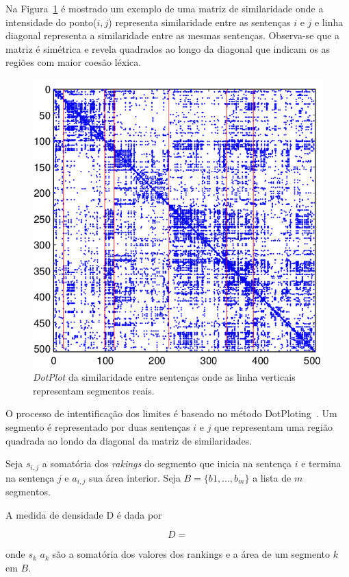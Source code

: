 \documentclass[10pt,a4paper]{article}
\begin{document}
Na Figura~\ref{fig:matrix-similarity} é mostrado um exemplo de uma matriz de similaridade onde a intensidade do ponto($i,j$) representa similaridade entre as sentenças $i$ e $j$ e linha diagonal representa a similaridade entre as mesmas sentenças. Observa-se que a matriz é simétrica e revela quadrados ao longo da diagonal que indicam os as regiões com maior coesão léxica.








  \begin{figure}[!h]
	  \centering
	  \includegraphics[width=1\textwidth]{c99.png}
	  \caption{\textit{DotPlot} da similaridade entre sentenças onde as linha verticais representam segmentos reais.}
	  \label{fig:matrix-similarity}
  \end{figure}




O processo de intentificação dos limites é baseado no método DotPloting~\cite{Reynar}. Um segmento é representado por duas sentenças $i$ e $j$ que representam uma região quadrada ao londo da diagonal da matriz de similaridades. 



Seja $s_{i,j}$ a somatória dos \textit{rakings} do segmento que inicia na sentença $i$ e termina na sentença $j$ e $a_{i,j}$ sua área interior. Seja $B = \{b1,...,b_m\}$ a lista de $m$ segmentos.


A medida de densidade D é dada por 

\begin{equation}
D = 
\end{equation}



onde $s_k$  $a_k$ são a somatória dos valores dos rankings e a área de um segmento $k$ em $B$.


\end{document}
